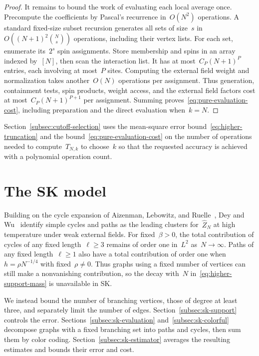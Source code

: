 \documentclass[letterpaper,11pt,reqno]{amsart}
\renewcommand{\geq}{\geqslant}
\begin{document}
\begin{proof}
It remains to bound the work of evaluating each local average once. Precompute the coefficients by Pascal's recurrence in~$O(N^2)$ operations. A standard fixed-size subset recursion generates all sets of size~$s$ in~$O((N+1)^2\binom Ns)$ operations, including their vertex lists. For each set, enumerate its~$2^s$ spin assignments. Store membership and spins in an array indexed by~$[N]$, then scan the interaction list. It has at most~$C_P(N+1)^P$ entries, each involving at most~$P$ sites. Computing the external field weight and normalization takes another~$O(N)$ operations per assignment. Thus generation, containment tests, spin products, weight access, and the external field factors cost at most~$C_P(N+1)^{P+1}$ per assignment. Summing proves~\eqref{eq:pure-evaluation-cost}, including preparation and the direct evaluation when~$k=N$.
\end{proof}

Section~\ref{subsec:cutoff-selection} uses the mean-square error bound~\eqref{eq:higher-truncation} and the bound~\eqref{eq:pure-evaluation-cost} on the number of operations needed to compute~$T_{N,k}$ to choose~$k$ so that the requested accuracy is achieved with a polynomial operation count.

\section{The SK model}\label{sec:sk}

Building on the cycle expansion of Aizenman, Lebowitz, and Ruelle~\cite{ALR87}, Dey and Wu~\cite{DW23} identify simple cycles and paths as the leading clusters for~$\widehat Z_N$ at high temperature under weak external fields. For fixed~$\beta>0$, the total contribution of cycles of any fixed length~$\ell\geq3$ remains of order one in~$L^2$ as~$N\to\infty$. Paths of any fixed length~$\ell\geq1$ also have a total contribution of order one when~$h=\rho N^{-1/4}$ with fixed~$\rho\ne0$. Thus graphs using a fixed number of vertices can still make a nonvanishing contribution, so the decay with~$N$ in~\eqref{eq:higher-support-mass} is unavailable in SK.

We instead bound the number of branching vertices, those of degree at least three, and separately limit the number of edges. Section~\ref{subsec:sk-support} controls the error. Sections~\ref{subsec:sk-evaluation} and~\ref{subsec:sk-colorful} decompose graphs with a fixed branching set into paths and cycles, then sum them by color coding. Section~\ref{subsec:sk-estimator} averages the resulting estimates and bounds their error and cost.
\end{document}
